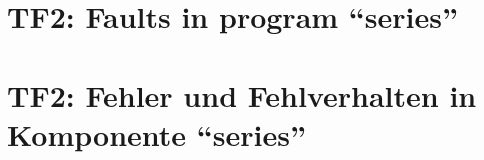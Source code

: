 
\thispagestyle{empty}
\ifenglish
\section*{TF2: Faults in program ``series''}

\fi
\ifgerman
\section*{TF2: Fehler und Fehlverhalten in Komponente "`series"'}

\fi

